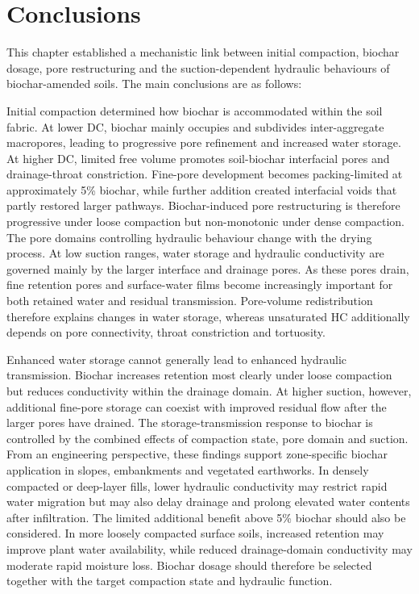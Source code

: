 \section{Conclusions}
This chapter established a mechanistic link between initial compaction, biochar dosage, pore restructuring and the suction-dependent hydraulic behaviours of biochar-amended soils. The main conclusions are as follows:\par
Initial compaction determined how biochar is accommodated within the soil fabric. At lower \ac{DC}, biochar mainly occupies and subdivides inter-aggregate macropores, leading to progressive pore refinement and increased water storage. At higher \ac{DC}, limited free volume promotes soil-biochar interfacial pores and drainage-throat constriction. Fine-pore development becomes packing-limited at approximately 5\% biochar, while further addition created interfacial voids that partly restored larger pathways. Biochar-induced pore restructuring is therefore progressive under loose compaction but non-monotonic under dense compaction. The pore domains controlling hydraulic behaviour change with the drying process. At low suction ranges, water storage and hydraulic conductivity are governed mainly by the larger interface and drainage pores. As these pores drain, fine retention pores and surface-water films become increasingly important for both retained water and residual transmission. Pore-volume redistribution therefore explains changes in water storage, whereas unsaturated HC additionally depends on pore connectivity, throat constriction and tortuosity.\par
Enhanced water storage cannot generally lead to enhanced hydraulic transmission. Biochar increases retention most clearly under loose compaction but reduces conductivity within the drainage domain. At higher suction, however, additional fine-pore storage can coexist with improved residual flow after the larger pores have drained. The storage-transmission response to biochar is controlled by the combined effects of compaction state, pore domain and suction. From an engineering perspective, these findings support zone-specific biochar application in slopes, embankments and vegetated earthworks. In densely compacted or deep-layer fills, lower hydraulic conductivity may restrict rapid water migration but may also delay drainage and prolong elevated water contents after infiltration. The limited additional benefit above 5\% biochar should also be considered. In more loosely compacted surface soils, increased retention may improve plant water availability, while reduced drainage-domain conductivity may moderate rapid moisture loss. Biochar dosage should therefore be selected together with the target compaction state and hydraulic function.\par